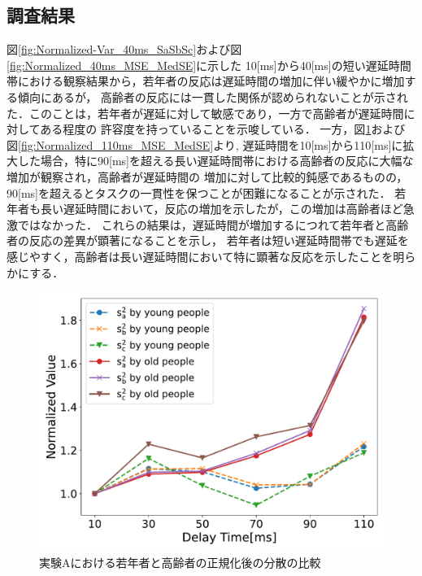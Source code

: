 \subsection{調査結果}
図\ref{fig:Normalized-Var_40ms_SaSbSc}および図\ref{fig:Normalized_40ms_MSE_MedSE}に示した
10[ms]から40[ms]の短い遅延時間帯における観察結果から，若年者の反応は遅延時間の増加に伴い緩やかに増加する傾向にあるが，
高齢者の反応には一貫した関係が認められないことが示された．このことは，若年者が遅延に対して敏感であり，一方で高齢者が遅延時間に対してある程度の
許容度を持っていることを示唆している．
一方，図\ref{fig:Normalized-Var_110ms_SaSbSc}および図\ref{fig:Normalized_110ms_MSE_MedSE}より,
遅延時間を10[ms]から110[ms]に拡大した場合，特に90[ms]を超える長い遅延時間帯における高齢者の反応に大幅な増加が観察され，高齢者が遅延時間の
増加に対して比較的鈍感であるものの，90[ms]を超えるとタスクの一貫性を保つことが困難になることが示された．
若年者も長い遅延時間において，反応の増加を示したが，この増加は高齢者ほど急激ではなかった．
これらの結果は，遅延時間が増加するにつれて若年者と高齢者の反応の差異が顕著になることを示し，
若年者は短い遅延時間帯でも遅延を感じやすく，高齢者は長い遅延時間において特に顕著な反応を示したことを明らかにする．
\begin{figure}[tbp]
  \centering
  \includegraphics[scale=0.3]{figures/Honbann/Comparison_young_old/110_var_normalized.pdf}
  \caption{実験Aにおける若年者と高齢者の正規化後の分散の比較}
  \label{fig:Normalized-Var_110ms_SaSbSc}
\end{figure}
